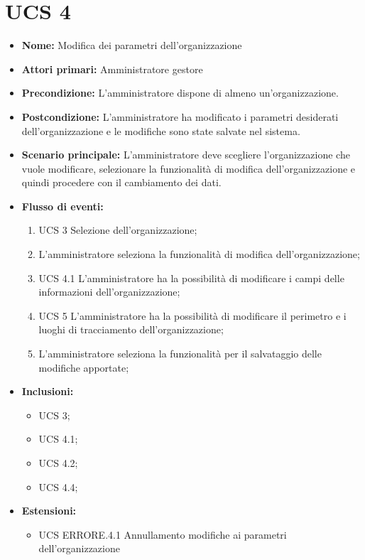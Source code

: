 

\section{UCS 4}%
\begin{itemize}
    \item \textbf{Nome:} Modifica dei parametri dell'organizzazione
    \item \textbf{Attori primari:} Amministratore gestore
    \item \textbf{Precondizione:} L’amministratore dispone di almeno un'organizzazione.
    \item \textbf{Postcondizione:} L’amministratore ha modificato i parametri desiderati dell'organizzazione e le modifiche sono state salvate nel sistema.
    \item \textbf{Scenario principale:} L'amministratore deve scegliere l'organizzazione che vuole modificare, selezionare la funzionalità di modifica dell'organizzazione e quindi procedere con il cambiamento dei dati.
    \item \textbf{Flusso di eventi:}
    \begin{enumerate}
        \item UCS 3 Selezione dell'organizzazione;
        \item L'amministratore seleziona la funzionalità di modifica dell'organizzazione;
        \item UCS 4.1 L'amministratore ha la possibilità di modificare i campi delle informazioni dell’organizzazione;
        \item UCS 5 L'amministratore ha la possibilità di modificare il perimetro e i luoghi di tracciamento dell’organizzazione;
        \item L'amministratore seleziona la funzionalità per il salvataggio delle modifiche apportate;
    \end{enumerate}
    \item \textbf{Inclusioni:}
    \begin{itemize}
        \item UCS 3;
        \item UCS 4.1;
        \item UCS 4.2;
        \item UCS 4.4;
    \end{itemize}
    \item \textbf{Estensioni:}
    \begin{itemize}
        \item UCS ERRORE.4.1 Annullamento modifiche ai parametri dell'organizzazione
    \end{itemize}
\end{itemize}

